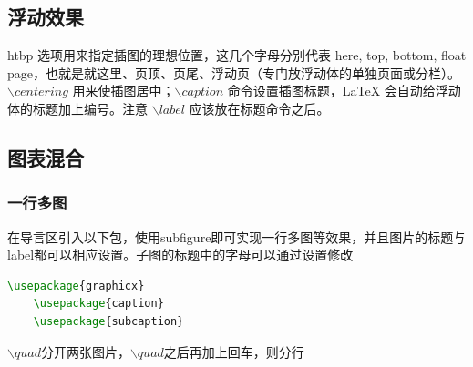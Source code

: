 \subsection{浮动效果}
 htbp 选项用来指定插图的理想位置，这几个字母分别代表 here, top, bottom, float page，也就是就这里、页顶、页尾、浮动页（专门放浮动体的单独页面或分栏）。$\backslash centering$ 用来使插图居中；$\backslash caption$ 命令设置插图标题，LaTeX 会自动给浮动体的标题加上编号。注意 $\backslash label$ 应该放在标题命令之后。

\subsection{图表混合}
\subsubsection{一行多图}
在导言区引入以下包，使用subfigure即可实现一行多图等效果，并且图片的标题与label都可以相应设置。子图的标题中的字母可以通过设置修改
\begin{lstlisting}[language={TeX}]
    \usepackage{graphicx}
    \usepackage{caption}
    \usepackage{subcaption}
\end{lstlisting}
$\backslash quad$分开两张图片，$\backslash quad$之后再加上回车，则分行

